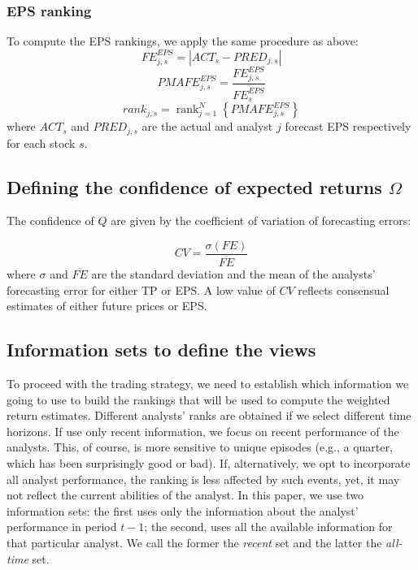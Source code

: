 \documentclass{article}\usepackage[]{graphicx}\usepackage[]{color}
\DeclareMathOperator{\rank}{rank}
\newcommand{\naive}{\textit{recent}}
\newcommand{\default}{\textit{all-time}}
\begin{document}
\subsubsection{EPS ranking} 
To compute the EPS rankings, we apply the same procedure as above:
\begin{equation}
FE_{j,s}^{EPS}=|{ACT_{s}-PRED_{j,s}}|
\end{equation}
\begin{equation}
PMAFE_{j,s}^{EPS}= \frac{FE_{j,s}^{EPS}}{\overline{FE_{s}^{EPS}}}
\end{equation}
\begin{equation}
\label{eps:rank}
rank_{j,s}=\rank_{j=1}^{N} \left\{ PMAFE_{j,s}^{EPS} \right\} 
\end{equation}
where $ACT_{s}$ and $PRED_{j,s}$ are the actual and  analyst $j$ forecast EPS respectively for each stock $s$.


\subsection{Defining the confidence of expected returns $\Omega$}
\label{def-omega}
The confidence of $Q$ are given by the coefficient of variation of forecasting errors:

\begin{equation}
CV = \frac{\sigma (FE)}{\overline{FE}}
\end{equation}
where $\sigma$ and $\overline{FE}$ are the standard deviation and the mean of the analysts' forecasting error for either TP or EPS. A low value of $CV$ reflects consensual estimates of either future prices or EPS.



\subsection{Information sets to define the views}

To proceed with the trading strategy, we need to establish which information we going to use to build the rankings that will be used to compute the weighted return estimates. Different analysts' ranks are obtained  if we select different time horizons. If use only recent information, we focus on recent performance of the analysts. This, of course, is more sensitive to unique episodes (e.g., a quarter, which has been surprisingly good or bad). If, alternatively, we opt to incorporate all analyst performance, the ranking is less affected by such events, yet, it may not reflect the current abilities of the analyst. In this paper, we use two information sets: the first uses only the  information about the analyst' performance in period $t-1$; the second, uses all the available  information for that particular analyst. We call the former the \naive{} set and the latter the \default{} set. 
\end{document}
